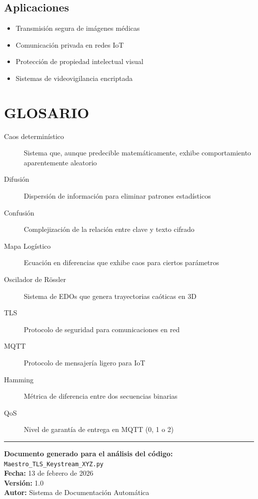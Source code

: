 \documentclass[12pt,a4paper]{article}
\begin{document}
\subsection{Aplicaciones}
\begin{itemize}
    \item Transmisión segura de imágenes médicas
    \item Comunicación privada en redes IoT
    \item Protección de propiedad intelectual visual
    \item Sistemas de videovigilancia encriptada
\end{itemize}

\section{GLOSARIO}

\begin{description}
    \item[Caos determinístico] Sistema que, aunque predecible matemáticamente, exhibe comportamiento aparentemente aleatorio
    \item[Difusión] Dispersión de información para eliminar patrones estadísticos
    \item[Confusión] Complejización de la relación entre clave y texto cifrado
    \item[Mapa Logístico] Ecuación en diferencias que exhibe caos para ciertos parámetros
    \item[Oscilador de Rössler] Sistema de EDOs que genera trayectorias caóticas en 3D
    \item[TLS] Protocolo de seguridad para comunicaciones en red
    \item[MQTT] Protocolo de mensajería ligero para IoT
    \item[Hamming] Métrica de diferencia entre dos secuencias binarias
    \item[QoS] Nivel de garantía de entrega en MQTT (0, 1 o 2)
\end{description}

\vspace{1cm}
\noindent\rule{\textwidth}{0.4pt}

\vspace{0.5cm}
\noindent\textbf{Documento generado para el análisis del código:} \texttt{Maestro\_TLS\_Keystream\_XYZ.py}\\
\textbf{Fecha:} 13 de febrero de 2026\\
\textbf{Versión:} 1.0\\
\textbf{Autor:} Sistema de Documentación Automática
\end{document}
